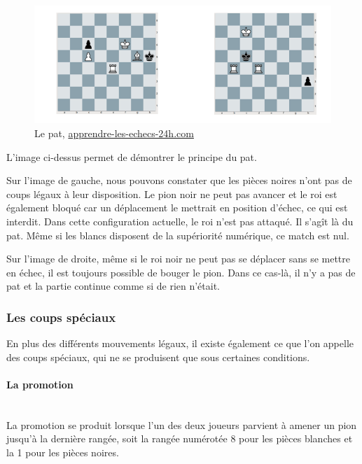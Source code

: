 \huge\documentclass{article}
\begin{document}
    \begin{figure}[h]
        \centering
        \includegraphics[scale=1]{img/pat.png}
        \caption{Le pat,  \href{https://www.apprendre-les-echecs-24h.com/blog/debuter-aux-echecs/le-pat/}{ apprendre-les-echecs-24h.com}}
    \end{figure}

    L'image ci-dessus permet de démontrer le principe du pat.

    Sur l'image de gauche, nous pouvons constater que les pièces noires n'ont pas de coups légaux à leur disposition. Le pion noir ne peut pas avancer et le roi est également bloqué car un déplacement le mettrait en position d'échec, ce qui est interdit. Dans cette configuration actuelle, le roi n'est pas attaqué. Il s'agît là du pat. Même si les blancs disposent de la supériorité numérique, ce match est nul.

    Sur l'image de droite, même si le roi noir ne peut pas se déplacer sans se mettre en échec, il est toujours possible de bouger le pion. Dans ce cas-là, il n'y a pas de pat et la partie continue comme si de rien n'était.

    \subsubsection{Les coups spéciaux}

    En plus des différents mouvements légaux, il existe également ce que l'on appelle des coups spéciaux, qui ne se produisent que sous certaines conditions.

    \paragraph{La promotion}
    ~~\\

    La promotion se produit lorsque l'un des deux joueurs parvient à amener un pion jusqu'à la dernière rangée, soit la rangée numérotée 8 pour les pièces blanches et la 1 pour les pièces noires.
\end{document}
